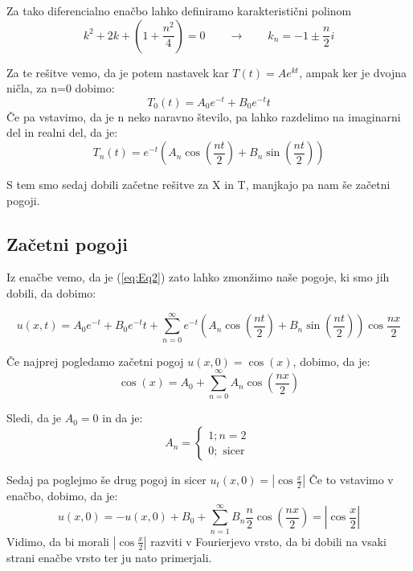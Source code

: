 \documentclass[11pt, a4paper]{article}
\theoremstyle{definition}
\theoremstyle{example}
\theoremstyle{izrek}
\begin{document}
Za tako diferencialno enačbo lahko definiramo karakteristični polinom 
\begin{equation}
\label{eq:Eq21}
k^2+2k+(1+\frac{n^2}{4})=0 \qquad \rightarrow \qquad k_n=-1 \pm \frac{n}{2}i
\end{equation}

Za te rešitve vemo, da je potem nastavek kar $T(t)=Ae^{kt}$, ampak ker je dvojna ničla, za n=0 dobimo:
\begin{equation}
\label{eq:Eq22}
T_0(t)=A_0 e^{-t}+B_0 e^{-t}t
\end{equation}
Če pa vstavimo, da je n neko naravno število, pa lahko razdelimo na imaginarni del in realni del, da je: 
\begin{equation}
\label{eq:Eq23}
T_n(t)=e^{-t}\left(A_n \cos\left(\frac{nt}{2}\right)+B_n\sin\left(\frac{nt}{2}\right)\right)
\end{equation}

S tem smo sedaj dobili začetne rešitve za X in T, manjkajo pa nam še začetni pogoji. 
\subsection{Začetni pogoji}
Iz enačbe vemo, da je (\ref{eq:Eq2}) zato lahko zmonžimo naše pogoje, ki smo jih dobili, da dobimo:

\begin{equation}
\label{eq:Eq24}
u(x,t)=A_0e^{-t}+B_0e^{-t}t+ \sum_{n=0}^{\infty} e^{-t} \left(A_n \cos\left(\frac{nt}{2}\right)+B_n\sin\left(\frac{nt}{2}\right)\right)\cos\frac{nx}{2}
\end{equation}

Če najprej pogledamo začetni pogoj $u(x,0)=\cos(x)$, dobimo, da je: 
$$\cos(x)=A_0+\sum_{n=0}^{\infty} A_n \cos(\frac{nx}{2})$$

Sledi, da je $A_0=0$ in da je:
$$A_{n}=\left\{\begin{array}{l}
1 ; n=2 \\
0 ; \text { sicer }
\end{array}\right.$$

Sedaj pa poglejmo še drug pogoj in sicer $u_t(x,0)=|\cos \frac{x}{2}|$
Če to vstavimo v enačbo, dobimo, da je:
\begin{equation}
\label{eq:Eq25}
u(x,0)=-u(x,0)+B_0+ \sum_{n=1}^{\infty} B_n \frac{n}{2} \cos\left(\frac{nx}{2}\right)=|\cos \frac{x}{2}|
\end{equation}
Vidimo, da bi morali $|\cos \frac{x}{2}|$ razviti v Fourierjevo vrsto, da bi dobili na vsaki strani enačbe vrsto ter ju nato primerjali.
\end{document}
